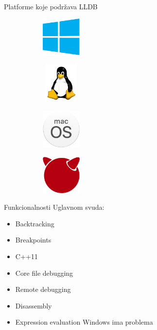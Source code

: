 \documentclass[bookmarks=true,bookmarksopen=true,pdfborder={0 0 0},pdfhighlight={/N},linkbordercolor={.5 .5 .5},implicit=false,unicode,xcolor={table}]{beamer}
\begin{document}
\begin{frame}{Platforme koje podržava LLDB}
	\begin{figure}
		
		\begin{subfigure}{2cm}
			\includegraphics[width=2cm,height=2cm]{windows_logo}
		\end{subfigure}
		\begin{subfigure}{2cm}
			\includegraphics[width=2cm,height=2cm]{linux_logo}
		\end{subfigure}
		\begin{subfigure}{2cm}
			\includegraphics[width=2cm,height=2cm]{mac_os}
		\end{subfigure}
		\begin{subfigure}{2cm}
			\includegraphics[width=2cm,height=2cm]{free_bsd}
		\end{subfigure}
	\end{figure}
\end{frame}

\begin{frame}{Funkcionalnosti}
	Uglavnom svuda:
	\begin{itemize}
		\item Backtracking 
		\item Breakpoints
		\item C++11
		\item Core file debugging
		\item Remote debugging
		\item Disassembly
		\item Expression evaluation {Windows ima problema}
	\end{itemize}
\end{frame}
\end{document}
